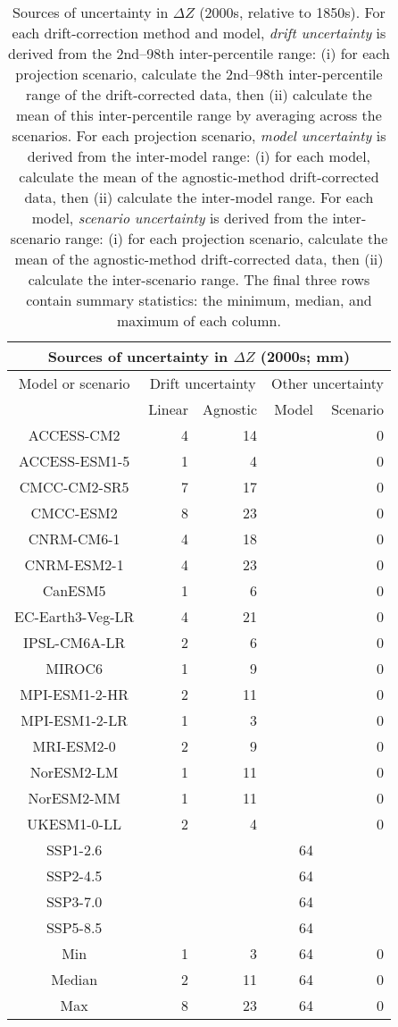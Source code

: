 \begin{table*}[t]
\centering
\caption{Sources of uncertainty in $\Delta Z$ (2000s, relative to 1850s). For each drift-correction method and model, \emph{drift uncertainty} is derived from the 2nd--98th inter-percentile range: (i) for each projection scenario, calculate the 2nd--98th inter-percentile range of the drift-corrected data, then (ii) calculate the mean of this inter-percentile range by averaging across the scenarios. For each projection scenario, \emph{model uncertainty} is derived from the inter-model range: (i) for each model, calculate the mean of the agnostic-method drift-corrected data, then (ii) calculate the inter-model range. For each model, \emph{scenario uncertainty} is derived from the inter-scenario range: (i) for each projection scenario, calculate the mean of the agnostic-method drift-corrected data, then (ii) calculate the inter-scenario range. The final three rows contain summary statistics: the minimum, median, and maximum of each column.}
\begin{tabular}{c|rr|rr}
\toprule
\multicolumn{5}{c}{Sources of uncertainty in $\Delta Z$ (2000s; mm)} \\ 
\midrule
Model or scenario & \multicolumn{2}{c|}{Drift uncertainty} & \multicolumn{2}{c}{Other uncertainty} \\
 & Linear & Agnostic & Model & Scenario \\
\midrule
ACCESS-CM2 & 4 & 14 &  & 0 \\
ACCESS-ESM1-5 & 1 & 4 &  & 0 \\
CMCC-CM2-SR5 & 7 & 17 &  & 0 \\
CMCC-ESM2 & 8 & 23 &  & 0 \\
CNRM-CM6-1 & 4 & 18 &  & 0 \\
CNRM-ESM2-1 & 4 & 23 &  & 0 \\
CanESM5 & 1 & 6 &  & 0 \\
EC-Earth3-Veg-LR & 4 & 21 &  & 0 \\
IPSL-CM6A-LR & 2 & 6 &  & 0 \\
MIROC6 & 1 & 9 &  & 0 \\
MPI-ESM1-2-HR & 2 & 11 &  & 0 \\
MPI-ESM1-2-LR & 1 & 3 &  & 0 \\
MRI-ESM2-0 & 2 & 9 &  & 0 \\
NorESM2-LM & 1 & 11 &  & 0 \\
NorESM2-MM & 1 & 11 &  & 0 \\
UKESM1-0-LL & 2 & 4 &  & 0 \\
SSP1-2.6 &  &  & 64 &  \\
SSP2-4.5 &  &  & 64 &  \\
SSP3-7.0 &  &  & 64 &  \\
SSP5-8.5 &  &  & 64 &  \\
\midrule
Min & 1 & 3 & 64 & 0 \\
Median & 2 & 11 & 64 & 0 \\
Max & 8 & 23 & 64 & 0 \\
\bottomrule
\end{tabular}
\end{table*}
